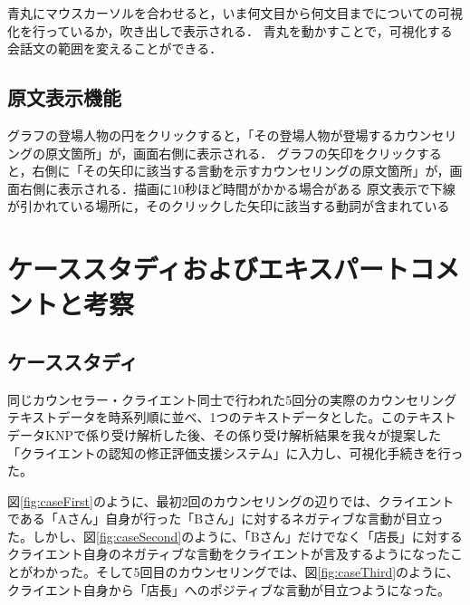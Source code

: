 \documentclass[shuuron]{kuee}
\begin{document}
青丸にマウスカーソルを合わせると，いま何文目から何文目までについての可視化を行っているか，吹き出しで表示される．
青丸を動かすことで，可視化する会話文の範囲を変えることができる．


\subsection{原文表示機能}

グラフの登場人物の円をクリックすると，「その登場人物が登場するカウンセリングの原文箇所」が，画面右側に表示される．
グラフの矢印をクリックすると，右側に「その矢印に該当する言動を示すカウンセリングの原文箇所」が，画面右側に表示される．描画に10秒ほど時間がかかる場合がある
原文表示で下線が引かれている場所に，そのクリックした矢印に該当する動詞が含まれている




\section{ケーススタディおよびエキスパートコメントと考察}

\subsection{ケーススタディ}

同じカウンセラー・クライエント同士で行われた5回分の実際のカウンセリングテキストデータを時系列順に並べ、1つのテキストデータとした。このテキストデータKNPで係り受け解析した後、その係り受け解析結果を我々が提案した「クライエントの認知の修正評価支援システム」に入力し、可視化手続きを行った。

図\ref{fig:caseFirst}のように、最初2回のカウンセリングの辺りでは、クライエントである「Aさん」自身が行った「Bさん」に対するネガティブな言動が目立った。しかし、図\ref{fig:caseSecond}のように、「Bさん」だけでなく「店長」に対するクライエント自身のネガティブな言動をクライエントが言及するようになったことがわかった。そして5回目のカウンセリングでは、図\ref{fig:caseThird}のように、クライエント自身から「店長」へのポジティブな言動が目立つようになった。
\end{document}
